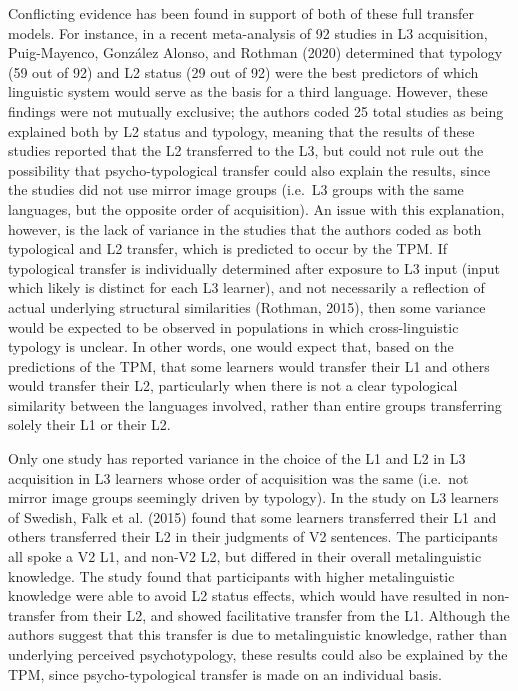 \documentclass[
  man]{apa6}
\begin{document}
Conflicting evidence has been found in support of both of these full transfer models.
For instance, in a recent meta-analysis of 92 studies in L3 acquisition, Puig-Mayenco, González Alonso, and Rothman (2020) determined that typology (59 out of 92) and L2 status (29 out of 92) were the best predictors of which linguistic system would serve as the basis for a third language.
However, these findings were not mutually exclusive; the authors coded 25 total studies as being explained both by L2 status and typology, meaning that the results of these studies reported that the L2 transferred to the L3, but could not rule out the possibility that psycho-typological transfer could also explain the results, since the studies did not use mirror image groups (i.e.~L3 groups with the same languages, but the opposite order of acquisition).
An issue with this explanation, however, is the lack of variance in the studies that the authors coded as both typological and L2 transfer, which is predicted to occur by the TPM.
If typological transfer is individually determined after exposure to L3 input (input which likely is distinct for each L3 learner), and not necessarily a reflection of actual underlying structural similarities (Rothman, 2015), then some variance would be expected to be observed in populations in which cross-linguistic typology is unclear.
In other words, one would expect that, based on the predictions of the TPM, that some learners would transfer their L1 and others would transfer their L2, particularly when there is not a clear typological similarity between the languages involved, rather than entire groups transferring solely their L1 or their L2.

Only one study has reported variance in the choice of the L1 and L2 in L3 acquisition in L3 learners whose order of acquisition was the same (i.e.~not mirror image groups seemingly driven by typology).
In the study on L3 learners of Swedish, Falk et al. (2015) found that some learners transferred their L1 and others transferred their L2 in their judgments of V2 sentences. The participants all spoke a V2 L1, and non-V2 L2, but differed in their overall metalinguistic knowledge.
The study found that participants with higher metalinguistic knowledge were able to avoid L2 status effects, which would have resulted in non-transfer from their L2, and showed facilitative transfer from the L1. Although the authors suggest that this transfer is due to metalinguistic knowledge, rather than underlying perceived psychotypology, these results could also be explained by the TPM, since psycho-typological transfer is made on an individual basis.
\end{document}
